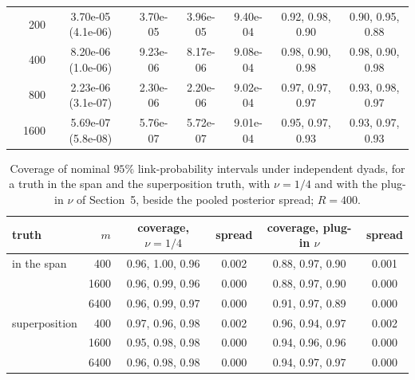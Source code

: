\documentclass[12pt]{article}
\begin{document}
\begin{table}[ht]
\begin{tabular}{lrcccccc}
 & 200 & 3.70e-05 (4.1e-06) & 3.70e-05 & 3.96e-05 & 9.40e-04 & 0.92, 0.98, 0.90 & 0.90, 0.95, 0.88 \\
 & 400 & 8.20e-06 (1.0e-06) & 9.23e-06 & 8.17e-06 & 9.08e-04 & 0.98, 0.90, 0.98 & 0.98, 0.90, 0.98 \\
 & 800 & 2.23e-06 (3.1e-07) & 2.30e-06 & 2.20e-06 & 9.02e-04 & 0.97, 0.97, 0.97 & 0.93, 0.98, 0.97 \\
 & 1600 & 5.69e-07 (5.8e-08) & 5.76e-07 & 5.72e-07 & 9.01e-04 & 0.95, 0.97, 0.93 & 0.93, 0.97, 0.93 \\
\bottomrule
\end{tabular}

\end{table}

\begin{table}[ht]
\centering
\caption{Coverage of nominal $95\%$ link-probability intervals under independent dyads, for a truth in the span and the superposition truth, with $\nu=1/4$ and with the plug-in $\nu$ of Section~5, beside the pooled posterior spread; $R=400$.}
\label{tab:coverage}
\begin{tabular}{lrcccc}
\toprule
truth & $m$ & coverage, $\nu=1/4$ & spread & coverage, plug-in $\nu$ & spread \\
\midrule
in the span & 400 & 0.96, 1.00, 0.96 & 0.002 & 0.88, 0.97, 0.90 & 0.001 \\
 & 1600 & 0.96, 0.99, 0.96 & 0.000 & 0.88, 0.97, 0.90 & 0.000 \\
 & 6400 & 0.96, 0.99, 0.97 & 0.000 & 0.91, 0.97, 0.89 & 0.000 \\
superposition & 400 & 0.97, 0.96, 0.98 & 0.002 & 0.96, 0.94, 0.97 & 0.002 \\
 & 1600 & 0.95, 0.98, 0.98 & 0.000 & 0.94, 0.96, 0.96 & 0.000 \\
 & 6400 & 0.96, 0.98, 0.98 & 0.000 & 0.94, 0.97, 0.97 & 0.000 \\
\bottomrule
\end{tabular}

\end{table}
\end{document}

